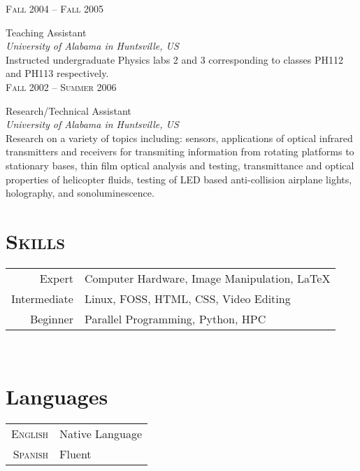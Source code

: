 \documentclass[letterpaper,10pt]{article}
\begin{document}
\begin{minipage}[t]{0.5\textwidth}
	\raggedleft
	\textsc{\normalsize Fall 2004 -- Fall 2005}\\
	\raggedright{\large Teaching Assistant\\
	\emph{University of Alabama in Huntsville, US}}\\[5pt]
	\normalsize{Instructed undergraduate Physics labs 2 and 3 corresponding to classes PH112 and PH113 respectively.}\\[10pt]

	\raggedleft
	\textsc{\normalsize Fall 2002 -- Summer 2006}\\
	\raggedright{\large Research/Technical Assistant\\
	\emph{University of Alabama in Huntsville, US}}\\[5pt]
	\normalsize{Research on a variety of topics including: sensors, applications of optical infrared transmitters and receivers for transmiting information from rotating platforms to stationary bases, thin film optical analysis and testing, transmittance and optical properties of helicopter fluids, testing of LED based anti-collision airplane lights, holography, and sonoluminescence.}\\[12pt]

\section{\textsc{Skills}}
	\begin{tabular}{rl}
		Expert			&	Computer Hardware, Image Manipulation, \LaTeX\\ 
		Intermediate	&	Linux, FOSS, HTML, CSS, Video Editing\\
		Beginner		&	Parallel Programming, Python, HPC
	\end{tabular}\\[12pt]

\section{Languages}
	\begin{tabular}{rl}
		\textsc{English}	&	Native Language\\
		\textsc{Spanish}	&	Fluent
	\end{tabular}

\end{minipage}
\hfill
\end{document}
